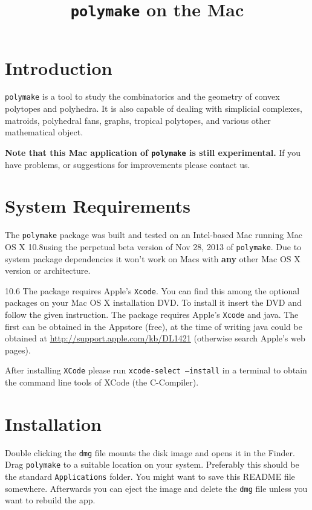 \documentclass[a4paper]{amsart}
\title{\texttt{polymake} on the Mac\\\polymakeversion}
\newcommand{\macversion}{10.8}
\newcommand{\polymakeversion}{ perpetual beta version of Nov 28, 2013\xspace}
\newcommand{\macsix}{10.6}
\newcommand{\polymake}{\texttt{polymake}\xspace}
\begin{document}
\maketitle
\parindent0pt

\section*{Introduction}

\polymake is a tool to study the combinatorics and the geometry of
convex polytopes and polyhedra. It is also capable of dealing with
simplicial complexes, matroids, polyhedral fans, graphs, tropical polytopes, and various other mathematical object.

\textbf{Note that this Mac application of \polymake is still
  experimental.} If you have problems, or suggestions for improvements
please contact us.

\section*{System Requirements}

The \polymake package was built and tested on an Intel-based Mac
running Mac OS X \macversion using the \polymakeversion of
\polymake. Due to system package dependencies it won't work on Macs
with \textbf{any} other Mac OS X version or architecture.

\ifx\macversion\macsix%
The package requires Apple's \texttt{Xcode}.  You can find this among
the optional packages on your Mac OS X installation DVD. To install it
insert the DVD and follow the given instruction.%
\else%
The package requires Apple's \texttt{Xcode} and java. The first can be
obtained in the Appstore (free), at the time of writing java could be
obtained at \url{http://support.apple.com/kb/DL1421} (otherwise search
Apple's web pages).

After installing \texttt{XCode} please run \texttt{xcode-select --install} in a terminal to obtain the command line tools of XCode (the C-Compiler).
\fi%

\section*{Installation}

Double clicking the \texttt{dmg} file mounts the disk image and opens
it in the Finder. Drag \polymake to a suitable location on your
system. Preferably this should be the standard \texttt{Applications}
folder. You might want to save this README file somewhere. Afterwards
you can eject the image and delete the  \texttt{dmg} file unless you
want to rebuild the app.
\end{document}
